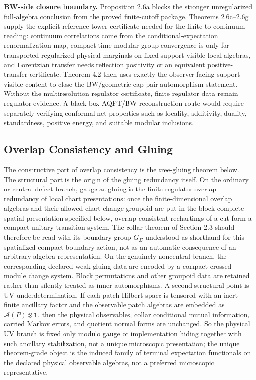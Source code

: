 \textbf{BW-side closure boundary.} Proposition 2.6a blocks the stronger unregularized full-algebra
conclusion from the proved finite-cutoff package. Theorems 2.6c--2.6g supply the explicit
reference-tower certificate needed for the finite-to-continuum reading: continuum correlations
come from the conditional-expectation renormalization map, compact-time modular group convergence
is only for transported regularized physical marginals on fixed support-visible local algebras,
and Lorentzian transfer needs reflection positivity or an equivalent positive-transfer
certificate. Theorem 4.2 then uses exactly the observer-facing support-visible content to close
the BW/geometric cap-pair automorphism statement. Without the multiresolution regulator
certificate, finite regulator data remain regulator evidence. A black-box AQFT/BW reconstruction
route would require separately verifying conformal-net properties such as locality, additivity,
duality, standardness, positive energy, and suitable modular inclusions.
\subsection{Overlap Consistency and Gluing}\label{3-overlap-consistency-and-gluing}

The constructive part of overlap consistency is the tree-gluing theorem below. The structural part is the origin of the gluing redundancy itself. On the ordinary or central-defect branch, gauge-as-gluing is the finite-regulator overlap redundancy of local chart presentations: once the finite-dimensional overlap algebras and their allowed chart-change groupoid are put in the block-complete spatial presentation specified below, overlap-consistent rechartings of a cut form a compact unitary transition system. The collar theorem of Section 2.3 should therefore be read with its boundary group \(G_\Sigma\) understood as shorthand for this spatialized compact boundary action, not as an automatic consequence of an arbitrary algebra representation. On the genuinely noncentral branch, the corresponding declared weak gluing data are encoded by a compact crossed-module change system. Block permutations and other groupoid data are retained rather than silently treated as inner automorphisms.
A second structural point is UV underdetermination. If each patch Hilbert space is tensored with an inert finite ancillary factor and the observable patch algebras are embedded as \(\mathcal A(P)\otimes \mathbf 1\), then the physical observables, collar conditional mutual information, carried Markov errors, and quotient normal forms are unchanged. So the physical UV branch is fixed only modulo gauge or implementation hiding together with such ancillary stabilization, not a unique microscopic presentation; the unique theorem-grade object is the induced family of terminal expectation functionals on the declared physical observable algebras, not a preferred microscopic representative.

